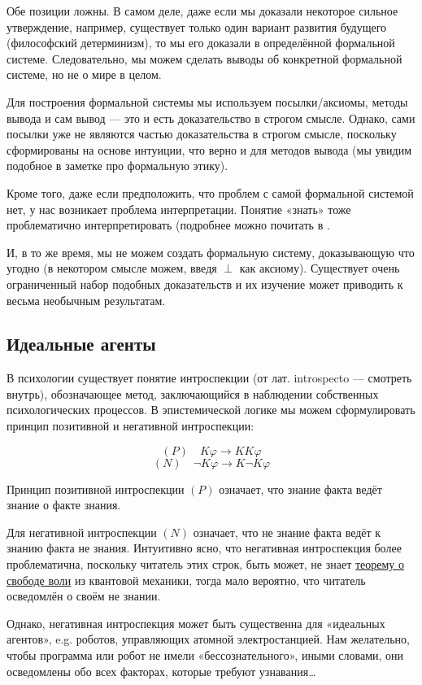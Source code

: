 \documentclass[openany]{book}
\theoremstyle{plain}
\theoremstyle{definition}
\begin{document}
Обе позиции ложны. В самом деле, даже если мы доказали некоторое сильное утверждение, например, существует только один вариант развития будущего (философский детерминизм), то мы его доказали в определённой формальной системе. Следовательно, мы можем сделать выводы об конкретной формальной системе, но не о мире в целом.

Для построения формальной системы мы используем посылки/аксиомы, методы вывода и сам вывод — это и есть доказательство в строгом смысле. Однако, сами посылки уже не являются частью доказательства в строгом смысле, поскольку сформированы на основе интуиции, что верно и для методов вывода (мы увидим подобное в заметке про формальную этику).

Кроме того, даже если предположить, что проблем с самой формальной системой нет, у нас возникает проблема интерпретации. Понятие «знать» тоже проблематично интерпретировать (подробнее можно почитать в \cite{Lewis}.

И, в то же время, мы не можем создать формальную систему, доказывающую что угодно (в некотором смысле можем, введя \(\perp\) как аксиому). Существует очень ограниченный набор подобных доказательств и их изучение может приводить к весьма необычным результатам.

\subsection{Идеальные агенты}

В психологии существует понятие интроспекции (от лат. introspecto — смотреть внутрь), обозначающее метод, заключающийся в наблюдении собственных психологических процессов. В эпистемической логике мы можем сформулировать принцип позитивной и негативной интроспекции:

$$(P) \quad K \varphi \to K K \varphi$$
$$(N) \quad \neg K \varphi \to K \neg K \varphi$$

Принцип позитивной интроспекции \((P)\) означает, что знание факта ведёт знание о факте знания.

Для негативной интроспекции \((N)\) означает, что не знание факта ведёт к знанию факта не знания. Интуитивно ясно, что негативная интроспекция более проблематична, поскольку читатель этих строк, быть может, не знает \href{https://ru.wikipedia.org/wiki/Теорема_о_свободе_воли}{теорему о свободе воли} из квантовой механики, тогда мало вероятно, что читатель осведомлён о своём не знании. 

Однако, негативная интроспекция может быть существенна для «идеальных агентов», e.g. роботов, управляющих атомной электростанцией. Нам желательно, чтобы программа или робот не имели «бессознательного», иными словами, они осведомлены обо всех факторах, которые требуют узнавания\dots
\end{document}
